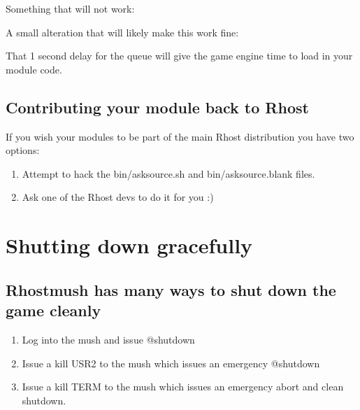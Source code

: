\documentclass[letterpaper,10pt,english]{sphinxmanual}
\begin{document}
\sphinxAtStartPar
Something that will not work:

\begin{sphinxVerbatim}[commandchars=\\\{\}]
  
\end{sphinxVerbatim}

\sphinxAtStartPar
A small alteration that will likely make this work fine:

\begin{sphinxVerbatim}[commandchars=\\\{\}]
   
\end{sphinxVerbatim}

\sphinxAtStartPar
That 1 second delay for the queue will give the game engine time to load in your module code.


\subsection{Contributing your module back to Rhost}
\label{\detokenize{advanced:contributing-your-module-back-to-rhost}}
\sphinxAtStartPar
If you wish your modules to be part of the main Rhost distribution you have two options:
\begin{enumerate}
%
\item {} 
\sphinxAtStartPar
Attempt to hack the bin/asksource.sh and bin/asksource.blank files.

\item {} 
\sphinxAtStartPar
Ask one of the Rhost devs to do it for you :)

\end{enumerate}


\section{Shutting down gracefully}
\label{\detokenize{advanced:shutting-down-gracefully}}

\subsection{Rhostmush has many ways to shut down the game cleanly}
\label{\detokenize{advanced:rhostmush-has-many-ways-to-shut-down-the-game-cleanly}}\begin{enumerate}
%
\item {} 
\sphinxAtStartPar
Log into the mush and issue @shutdown

\item {} 
\sphinxAtStartPar
Issue a kill \sphinxhyphen{}USR2 to the mush which issues an emergency @shutdown

\item {} 
\sphinxAtStartPar
Issue a kill \sphinxhyphen{}TERM to the mush which issues an emergency abort and clean shutdown.

\end{enumerate}
\end{document}
